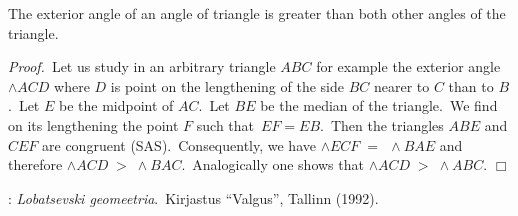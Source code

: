 \documentclass[12pt]{article}
\begin{document}
The exterior angle of an angle of triangle is greater than both other 
angles of the triangle.

{\it Proof.}\, Let us study in an arbitrary triangle $ABC$ for example the exterior angle $\wedge ACD$ where $D$ is point on the lengthening of the side  $BC$ nearer to $C$ than to $B$.\, Let $E$ be the midpoint of $AC$.\, Let $BE$ be the median of the triangle.\, We find on its lengthening the point $F$ such that\, $EF = EB$.\, Then the triangles $ABE$ and $CEF$ are congruent (SAS).\, Consequently, we have\; 
$\wedge ECF \;=\;\, \wedge BAE$\;
and therefore\; $\wedge ACD \;>\; \wedge BAC$.\;\, Analogically one shows that\; 
$\wedge ACD \;>\; \wedge ABC$.\;\; $\Box$

\begin{thebibliography}{8}
: {\it Lobatsevski geomeetria}.\, Kirjastus ``Valgus'', Tallinn (1992).
\end{thebibliography} 
\end{document}
